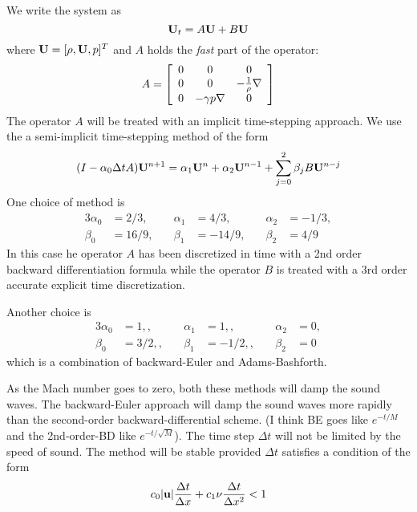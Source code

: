 \documentclass{article}
\begin{document}
We write the system as
\[
   {\bf U}_t = A {\bf U} + B {\bf U} 
\]
where ${\bf U}=[\rho, {\bf U}, p]^T$ and  $A$ holds the {\sl fast} part of the operator:
\[
  A = \left[ \begin{array}{ccc}
                0 & 0 & 0 \\
                0 & 0 & -{1\over\rho} \nabla  \\
                0 &  -\gamma p \nabla  & 0 
             \end{array} \right]
\]
The operator $A$ will be treated with an implicit time-stepping approach.  
We use the a semi-implicit time-stepping method of the form
\begin{equation}
(I - \alpha_0 {\Delta t} A) {\bf U}^{n+1} = \alpha_1 {\bf U}^n + \alpha_2{\bf U}^{n-1}
                  + \sum_{j=0}^2 \beta_j B {\bf U}^{n-j}  \label{eq:ts}
\end{equation}
One choice of method is
\begin{alignat*}{3}
 \alpha_0 &=2/3, &\quad \alpha_1&=4/3,  &\quad \alpha_2&=-1/3, \\
 \beta_0&=16/9,  &\quad \beta_1&=-14/9, &\quad  \beta_2&=4/9 
\end{alignat*}
In this case he operator $A$ has been discretized in time with a 2nd order backward differentiation 
formula while the
operator $B$ is treated with a 3rd order accurate explicit time discretization. 

Another choice is
\begin{alignat*}{3}
 \alpha_0 &=1, , &\quad \alpha_1 &=1, , &\quad \alpha_2&=0, \\
 \beta_0 &=3/2,, &\quad  \beta_1 &=-1/2, , &\quad \beta_2&=0
\end{alignat*}
which is a combination of backward-Euler and Adams-Bashforth.

As the Mach number goes to zero, both these  methods will damp the sound waves. The
backward-Euler approach will damp the sound waves more rapidly than the second-order
backward-differential scheme. (I think BE goes like $e^{-t/M}$ and the 2nd-order-BD like
$e^{-t/\sqrt{M}}$).
The time step $\Delta t$ will not be limited by the speed of sound.
The method will be stable provided $\Delta t$ satisfies a condition of the form
\[
           c_0 |{\bf u}| {\Delta t\over \Delta x} + c_1 \nu {\Delta t \over \Delta x ^2} < 1
\]
\end{document}
